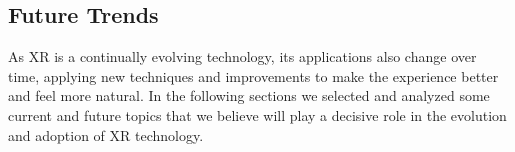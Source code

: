 


\subsection{Future Trends}
As XR is a continually evolving technology, its applications also change over time, applying new techniques and improvements to make the experience better and feel more natural. In the following sections we selected and analyzed some current and future topics that we believe will play a decisive role in the evolution and adoption of XR technology.
